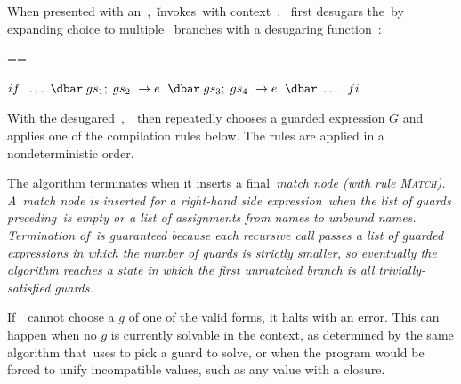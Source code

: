 \documentclass[article,screen,12pt, nonacm]{acmart}
\begin{document}
       




    When presented with an~\iffibf,~\DTran\~invokes~\Compile with context~\ctx.
    \Compile~first desugars the~\iffibf by expanding choice to multiple~\iffibf
    branches with a desugaring function~\ITran: 
    
    
    ==
    
    ${if\;~\dots~\dbar\; gs_{1};\; gs_{2}~\rightarrow e~\;\dbar\; gs_{3};\; gs_{4}~\rightarrow e~\;\dbar~\dots~\;fi}$

    With the desugared~\iffibf,~\Compile\ then repeatedly chooses a guarded
    expression $G$ and applies one of the compilation rules below. The rules are
    applied in a nondeterministic order. 

    The algorithm terminates when it inserts a final~\it{match} node (with rule
    \textsc{Match}).  A~\it{match} node is inserted for a right-hand side expression~\expr when the list of
    guards preceding~\expr is empty or a list of assignments from names to
    unbound names. Termination of~\DTran\~is guaranteed because each recursive
    call passes a list of guarded expressions in which the number of guards is
    strictly smaller, so eventually the algorithm reaches a state in which the
    first unmatched branch is all trivially-satisfied guards.


    If~\Compile\ cannot choose a $g$ of
    one of the valid forms, it halts with an error. This
    can happen when no $g$ is currently solvable in the context, as determined
    by the same algorithm that~\VMinus uses to pick a guard to solve, or when
    the program would be forced to unify incompatible values, such as any value
    with a closure. 
\end{document}
